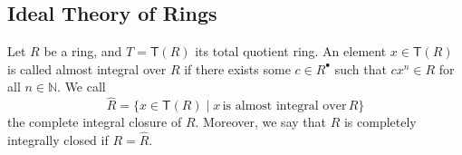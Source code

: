 \documentclass[a4paper, 10pt]{amsart}
\newcommand{\defit}[1]{{\textsf{#1}}}
\theoremstyle{plain}
\theoremstyle{definition}
\theoremstyle{remark}
\newcommand{\N}{\mathbb N}
\numberwithin{equation}{section}
\begin{document}


\subsection{Ideal Theory of Rings}\label{ssec:ideal theory} Let $R$ be a ring, and $T=\mathsf{T}(R)$ its total quotient ring. An element $x\in \mathsf T(R)$ is called \defit{almost integral} over $R$ if there exists some $c\in R^\bullet$ such that $cx^n\in R$ for all $n\in \N.$ We call \[\widehat{R}=\{x\in \mathsf{T}(R)\mid x\, \text{is almost integral over} \, R\}\] the \defit{complete integral closure} of $R$. Moreover, we say that $R$ is \defit{completely integrally closed} if $R=\widehat{R}.$  
   
\end{document}
